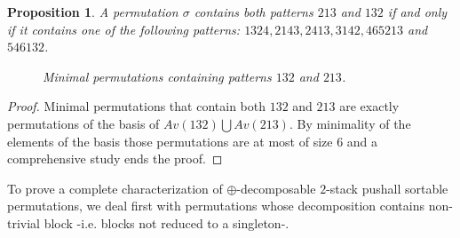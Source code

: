 \documentclass[11pt]{article}
\newtheorem{prop}[thm]{Proposition}
\newcommand{\pushall}{$2$-stack pushall sortable\xspace}
\newcounter{indice}
\newcommand{\permutation}[1]{
\setcounter{indice}{0};
\foreach \i in {#1} 
\addtocounter{indice}{1};

\addtocounter{indice}{1}
\draw [help lines] (1,1) grid (\theindice,\theindice);

\setcounter{indice}{1};

\foreach \i in { #1 } {
\draw (\theindice+.5,\i+.5) [fill] circle (.2);
\addtocounter{indice}{1};
}
\addtocounter{indice}{-1};
}
\begin{document}
\begin{prop}\label{prop:132et213}
A permutation $\sigma$ contains both patterns $213$ and $132$ if and only if it contains one of the following patterns:
$1324, 2143, 2413, 3142, 465213$ and $546132$.

\begin{figure}[H]
\begin{center}
\caption{Minimal permutations containing patterns $132$ and $213$.}
\label{fig:132et213}
\end{center}
\end{figure}
\end{prop}

\begin{proof}
Minimal permutations that contain both $132$ and $213$ are exactly permutations of the basis of $Av(132) \bigcup Av(213)$. 
By minimality of the elements of the basis those permutations are at most of size $6$ and a comprehensive study ends the proof.
\end{proof}

To prove a complete characterization of $\oplus$-decomposable \pushall permutations, we deal first with permutations whose decomposition contains non-trivial block -i.e. blocks not reduced to a singleton-.
\end{document}
